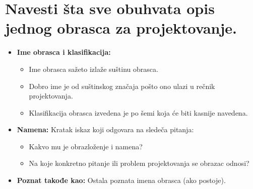 \documentclass[a4paper]{article}
\begin{document}
\section{Navesti šta sve obuhvata opis jednog obrasca za projektovanje.}
  \begin{itemize}
    \item \textbf{Ime obrasca i klasifikacija:}
          \begin{itemize}
            \item Ime obrasca sažeto izlaže suštinu obrasca.
            \item Dobro ime je od suštinskog značaja pošto ono ulazi u rečnik projektovanja.
            \item Klasifikacija obrasca izvedena je po šemi koja će biti kasnije navedena.
          \end{itemize}
    \item \textbf{Namena:} Kratak iskaz koji odgovara na sledeča pitanja:
          \begin{itemize}
            \item Kakvo mu je obrazloženje i namena?
            \item Na koje konkretno pitanje ili problem projektovanja se obrazac odnosi?
          \end{itemize}
    \item \textbf{Poznat takođe kao:} Ostala poznata imena obrasca (ako postoje).


\end{itemize}
\end{document}

